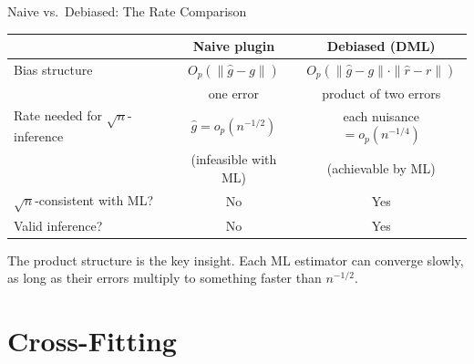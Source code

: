 \documentclass[aspectratio=169, 11pt, handout]{beamer}
\begin{document}
\begin{frame}{Naive vs.\ Debiased: The Rate Comparison}

\begin{center}
\begin{tabular}{lcc}
\toprule
& \textbf{Naive plugin} & \textbf{Debiased (DML)} \\
\midrule
Bias structure & $O_p(\|\hat{g} - g\|)$ & $O_p(\|\hat{g} - g\| \cdot \|\hat{r} - r\|)$ \\
 & one error & product of two errors \\[0.3em]
Rate needed for $\sqrt{n}$-inference & $\hat g = o_p(n^{-1/2})$ & each nuisance $= o_p(n^{-1/4})$ \\
 & (infeasible with ML) & (achievable by ML) \\[0.3em]
$\sqrt{n}$-consistent with ML? & No & Yes \\
Valid inference? & No & Yes \\
\bottomrule
\end{tabular}
\end{center}

\bigskip
\pause

The product structure is the key insight. Each ML estimator can converge slowly, as long as their errors multiply to something faster than $n^{-1/2}$.

\end{frame}


\section{Cross-Fitting}
\end{document}
